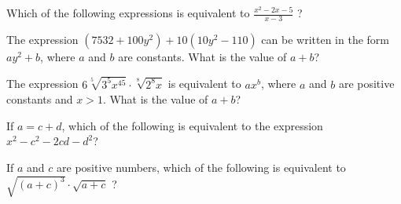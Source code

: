 \newpage

\noindent\markforreview
\vspace{1em}

Which of the following expressions is equivalent to \(\frac{x^2 - 2x - 5}{x - 3}\) ?

\vspace{0.75em}


\vspace{2em}

\noindent\markforreview
\vspace{1em}

The expression \((7532 + 100y^2) + 10(10y^2 - 110)\)  
can be written in the form \(ay^2 + b\), where \(a\) and \(b\) are constants.  
What is the value of \(a + b\)?

\vspace{0.75em}


\newpage


\noindent\markforreview
\vspace{1em}

The expression \(6 \sqrt[5]{3^5x^{45}} \cdot \sqrt[8]{2^8x}\) is equivalent to \(ax^b\),  
where \(a\) and \(b\) are positive constants and \(x > 1\).  
What is the value of \(a + b\)?

\vspace{0.75em}



\vspace{2em}

\noindent\markforreview
\vspace{1em}

If \(a = c + d\), which of the following is equivalent to the expression  
\(x^2 - c^2 - 2cd - d^2\)?

\vspace{0.75em}



\vspace{2em}

\noindent\markforreview
\vspace{1em}

If \(a\) and \(c\) are positive numbers, which of the following  
is equivalent to \(\sqrt{(a + c)^3} \cdot \sqrt{a + c}\) ?

\vspace{0.75em}




\newpage
